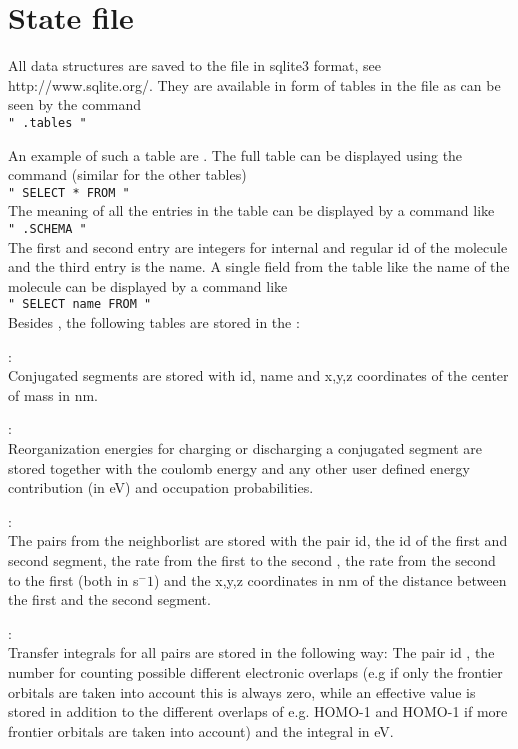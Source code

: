 \section{State file}
\label{sec:statefile}
All data structures are saved to the \sqlstate file in sqlite3 format, see http://www.sqlite.org/.
They are available in form of tables in the \sqlstate file as can be seen by the command\\
{\small \sqlite \sqlstate \texttt{" .tables "}}

An example of such a table are \sqlmolecules. The full table can be displayed using the command (similar for the other tables)\\
{\small \sqlite \sqlstate \texttt{" SELECT * FROM \sqlmolecules"}}\\
The meaning of all the entries in the table can be displayed by a command like\\
{\small \sqlite \sqlstate \texttt{" .SCHEMA \sqlmolecules"}}\\
The first and second entry are  integers for internal and regular id of the molecule and the third entry is the name. 
A single field from the table like the name of the molecule can be displayed by a command like\\
{\small \sqlite \sqlstate \texttt{" SELECT name FROM \sqlmolecules"}}\\
Besides \sqlmolecules, the following tables are stored in the \sqlstate:

\sqlconjsegproperties:\\
Conjugated segments are stored with id, name and x,y,z coordinates of the center of mass in nm.

\sqlconjsegs:\\
Reorganization energies for charging or discharging a conjugated segment are stored together with the coulomb energy and any other user defined energy contribution (in eV) and occupation probabilities.

\sqlpairs:\\
The pairs from the neighborlist are stored with the pair id, the id of the first and second segment, the rate from the first to the second , the rate from the second to the first (both in s$^-1$)  and the x,y,z coordinates in nm of the distance between the first and the second segment.

\sqlpairintegrals:\\
Transfer integrals for all pairs are stored in the following way:  The pair id , the number for counting possible different electronic overlaps (e.g if only the frontier orbitals are taken into account this is always zero, while an effective value is stored in addition to the different overlaps of e.g. HOMO-1 and HOMO-1 if more frontier orbitals are taken into account) and the integral in eV.

